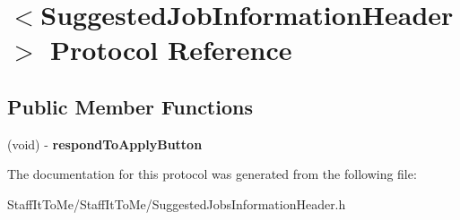 \hypertarget{protocol_suggested_job_information_header-p}{
\section{$<$\-Suggested\-Job\-Information\-Header$>$ \-Protocol \-Reference}
\label{protocol_suggested_job_information_header-p}
}
\subsection*{\-Public \-Member \-Functions}
\begin{DoxyCompactItemize}
\item 
\hypertarget{protocol_suggested_job_information_header-p_ab805b70b993462fb423531b444972b57}{
(void) -\/ {\bfseries respond\-To\-Apply\-Button}}
\label{protocol_suggested_job_information_header-p_ab805b70b993462fb423531b444972b57}

\end{DoxyCompactItemize}


\-The documentation for this protocol was generated from the following file\-:\begin{DoxyCompactItemize}
\item 
\-Staff\-It\-To\-Me/\-Staff\-It\-To\-Me/\-Suggested\-Jobs\-Information\-Header.\-h\end{DoxyCompactItemize}
